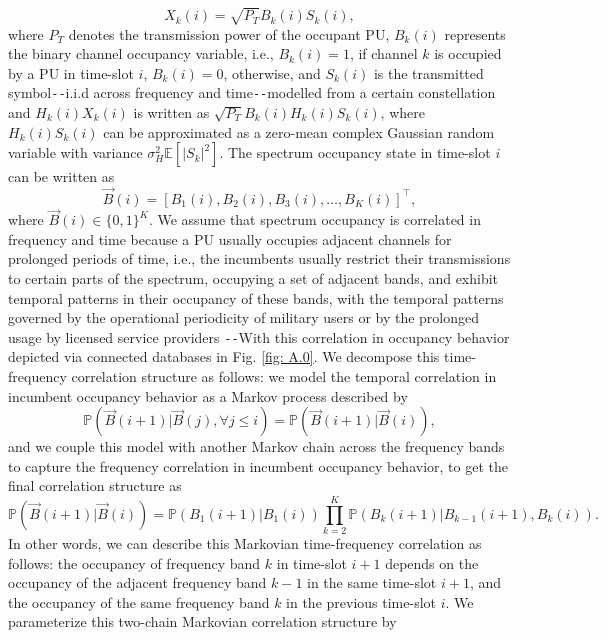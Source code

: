 \documentclass[12pt, draftcls, onecolumn]{IEEEtran}
\begin{document}
\begin{equation}\label{3}
    X_{k}(i)=\sqrt{P_{T}}B_{k}(i)S_{k}(i),
\end{equation}
where $P_{T}$ denotes the transmission power of the occupant PU, $B_{k}(i)$ represents the binary channel occupancy variable, i.e., $B_{k}(i){=}1$, if channel $k$ is occupied by a PU in time-slot $i$, $B_{k}(i){=}0$, otherwise, and $S_{k}(i)$ is the transmitted symbol\texttt{-{}-}i.i.d across frequency and time\texttt{-{}-}modelled from a certain constellation and $H_{k}(i)X_{k}(i)$ is written as $\sqrt{P_{T}}B_{k}(i)H_{k}(i)S_{k}(i)$, where $H_{k}(i)S_{k}(i)$ can be approximated as a zero-mean complex Gaussian random variable with variance $\sigma_{H}^{2}\mathbb{E}[|S_{k}|^{2}]$. The spectrum occupancy state in time-slot $i$ can be written as
\begin{equation}\label{4}
    \vec{B}(i)=[B_{1}(i),B_{2}(i),B_{3}(i),\dots,B_{K}(i)]^{\intercal},
\end{equation}
where $\vec{B}(i){\in}\{0,1\}^{K}$.
We assume that spectrum occupancy is correlated in frequency and time because a PU usually occupies adjacent channels for prolonged periods of time, i.e., the incumbents usually restrict their transmissions to certain parts of the spectrum, occupying a set of adjacent bands, and exhibit temporal patterns in their occupancy of these bands, with the temporal patterns governed by the operational periodicity of military users or by the prolonged usage by licensed service providers \cite{WCL:12}\texttt{-{}-}With this correlation in occupancy behavior depicted via connected databases in Fig. \ref{fig: A.0}. We decompose this time-frequency correlation structure as follows: we model the temporal correlation in incumbent occupancy behavior as a Markov process described by
\begin{equation}\label{5}
    \mathbb{P}(\vec{B}(i+1)|\vec{B}(j),\forall j \leq i)=\mathbb{P}(\vec{B}(i+1)|\vec{B}(i)),
\end{equation}
and we couple this model with another Markov chain across the frequency bands to capture the frequency correlation in incumbent occupancy behavior, to get the final correlation structure as
\begin{equation}\label{6}
    \mathbb{P}(\vec{B}(i+1)|\vec{B}(i))=\mathbb{P}(B_{1}(i+1)|B_{1}(i))\prod_{k=2}^{K}\mathbb{P}(B_{k}(i+1)|B_{k-1}(i+1),B_{k}(i)).
\end{equation}
In other words, we can describe this Markovian time-frequency correlation as follows: the occupancy of frequency band $k$ in time-slot $i+1$ depends on the occupancy of the adjacent frequency band $k-1$ in the same time-slot $i+1$, and the occupancy of the same frequency band $k$ in the previous time-slot $i$. We parameterize this two-chain Markovian correlation structure by
\end{document}
